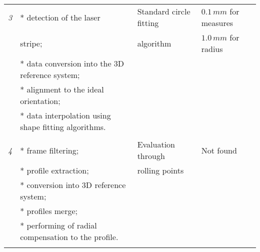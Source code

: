 \begin{table}[t!]
\begin{tabular}{|l|p{4cm}|p{4cm}|l|}
\hline
\textit{3}  & * detection of the laser                                           & Standard circle fitting                                                      & $0.1 \, mm$ for measures \\
            & stripe;                                                            & algorithm                                                                    & $1.0 \, mm$ for radius   \\
            & * data conversion into the 3D reference system;                    &                                                                              &                          \\
            & * alignment to the ideal orientation;                              &                                                                              &                          \\
            & * data interpolation using shape fitting algorithms.               &                                                                              &                          \\
            &                                                                    &                                                                              &                          \\

\hline
\textit{4}  & * frame filtering;                                                 & Evaluation through                                                           & Not found           \\
            & * profile extraction;                                              & rolling points                                                               &                     \\
            & * conversion into 3D reference system;                             &                                                                              &                     \\
            & * profiles merge;                                                  &                                                                              &                     \\
            & * performing of radial compensation to the profile.                &                                                                              &                     \\
            &                                                                    &                                                                              &                     \\


\end{tabular}
\end{table}
